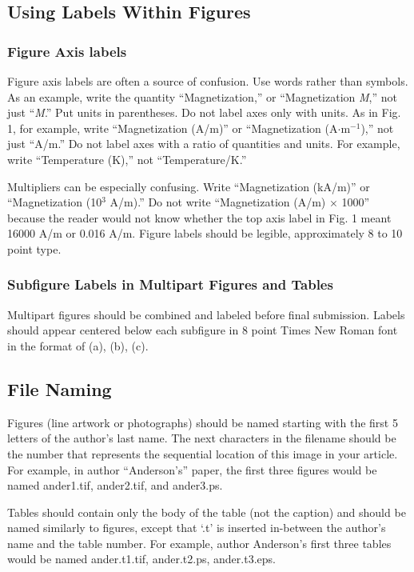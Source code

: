 \documentclass[journal]{IEEEtran}
\begin{document}
\subsection{Using Labels Within Figures}

\subsubsection{Figure Axis labels}

Figure axis labels are often a source of confusion. Use words rather than symbols. As an example, write the quantity ``Magnetization,'' or ``Magnetization {\em M},'' not just ``{\em M}.'' Put units in parentheses. Do not label axes only with units. As in Fig. 1, for example, write ``Magnetization (A/m)'' or ``Magnetization (A$\cdot$m$^{-1}$),'' not just ``A/m.'' Do not label axes with a ratio of quantities and units. For example, write ``Temperature (K),'' not ``Temperature/K.''

Multipliers can be especially confusing. Write ``Magnetization (kA/m)'' or ``Magnetization (10$^{3}$ A/m).'' Do not write ``Magnetization (A/m) $\times$ 1000'' because the reader would not know whether the top axis label in Fig. 1 meant 16000 A/m or 0.016 A/m. Figure labels should be legible, approximately 8 to 10 point type. 

\subsubsection{Subfigure Labels in Multipart Figures and Tables}

Multipart figures should be combined and labeled before final submission. Labels should appear centered below each subfigure in 8 point Times New Roman font in the format of (a), (b), (c). 

\subsection{File Naming}

Figures (line artwork or photographs) should be named starting with the first 5 letters of the author’s last name. The next characters in the filename should be the number that represents the sequential location of this image in your article. For example, in author ``Anderson’s'' paper, the first three figures would be named ander1.tif, ander2.tif, and ander3.ps.

Tables should contain only the body of the table (not the caption) and should be named similarly to figures, except that `.t' is inserted in-between the author’s name and the table number. For example, author Anderson’s first three tables would be named ander.t1.tif, ander.t2.ps, ander.t3.eps.
\end{document}
